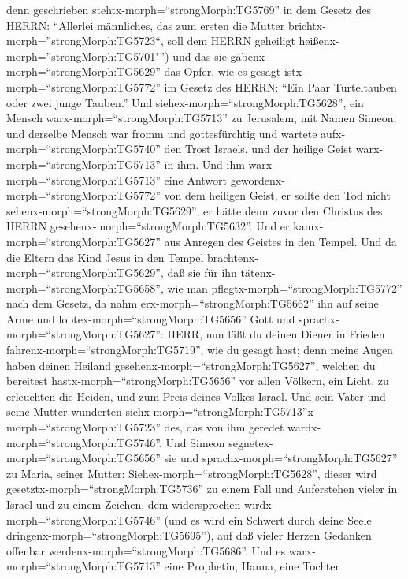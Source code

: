 denn geschrieben stehtx-morph=``strongMorph:TG5769'' in dem Gesetz des
HERRN: ``Allerlei männliches, das zum ersten die Mutter
brichtx-morph=''strongMorph:TG5723``, soll dem HERRN geheiligt
heißenx-morph=''strongMorph:TG5701"'')  und das sie
gäbenx-morph=``strongMorph:TG5629'' das Opfer, wie es gesagt
istx-morph=``strongMorph:TG5772'' im Gesetz des HERRN: ``Ein Paar
Turteltauben oder zwei junge Tauben.''  Und
siehex-morph=``strongMorph:TG5628'', ein Mensch
warx-morph=``strongMorph:TG5713'' zu Jerusalem, mit Namen Simeon; und
derselbe Mensch war fromm und gottesfürchtig und wartete
aufx-morph=``strongMorph:TG5740'' den Trost Israels, und der heilige
Geist warx-morph=``strongMorph:TG5713'' in ihm.  Und ihm
warx-morph=``strongMorph:TG5713'' eine Antwort
gewordenx-morph=``strongMorph:TG5772'' von dem heiligen Geist, er sollte
den Tod nicht sehenx-morph=``strongMorph:TG5629'', er hätte denn zuvor
den Christus des HERRN gesehenx-morph=``strongMorph:TG5632''.
 Und er kamx-morph=``strongMorph:TG5627'' aus Anregen des
Geistes in den Tempel. Und da die Eltern das Kind Jesus in den Tempel
brachtenx-morph=``strongMorph:TG5629'', daß sie für ihn
tätenx-morph=``strongMorph:TG5658'', wie man
pflegtx-morph=``strongMorph:TG5772'' nach dem Gesetz,  da
nahm erx-morph=``strongMorph:TG5662'' ihn auf seine Arme und
lobtex-morph=``strongMorph:TG5656'' Gott und
sprachx-morph=``strongMorph:TG5627'':  HERR, nun läßt du
deinen Diener in Frieden fahrenx-morph=``strongMorph:TG5719'', wie du
gesagt hast;  denn meine Augen haben deinen Heiland
gesehenx-morph=``strongMorph:TG5627'',  welchen du
bereitest hastx-morph=``strongMorph:TG5656'' vor allen Völkern,
 ein Licht, zu erleuchten die Heiden, und zum Preis deines
Volkes Israel.  Und sein Vater und seine Mutter wunderten
sichx-morph=``strongMorph:TG5713''x-morph=``strongMorph:TG5723'' des,
das von ihm geredet wardx-morph=``strongMorph:TG5746''. 
Und Simeon segnetex-morph=``strongMorph:TG5656'' sie und
sprachx-morph=``strongMorph:TG5627'' zu Maria, seiner Mutter:
Siehex-morph=``strongMorph:TG5628'', dieser wird
gesetztx-morph=``strongMorph:TG5736'' zu einem Fall und Auferstehen
vieler in Israel und zu einem Zeichen, dem widersprochen
wirdx-morph=``strongMorph:TG5746''  (und es wird ein
Schwert durch deine Seele dringenx-morph=``strongMorph:TG5695''), auf
daß vieler Herzen Gedanken offenbar
werdenx-morph=``strongMorph:TG5686''.  Und es
warx-morph=``strongMorph:TG5713'' eine Prophetin, Hanna, eine Tochter
